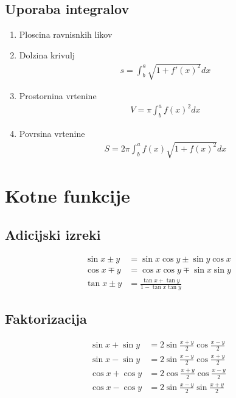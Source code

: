 \documentclass[a4paper,oneside,10pt]{article}
\theoremstyle{definition}
\begin{document}
\begin{multicols}{2}
	\subsection*{Uporaba integralov}
	\begin{enumerate}
		\item Ploscina ravnisnkih likov
		\item Dolzina krivulj
		\begin{align*}
			s = \int_{b}^{a} \sqrt{1 + f'(x)^2} dx
		\end{align*}
		\item Prostornina vrtenine
		\begin{align*}
			V = \pi \int_{b}^{a} f(x)^2 dx
		\end{align*}
		\item Povrsina vrtenine
		\begin{align*}
			S = 2\pi \int_{b}^{a} f(x)\sqrt{1+f(x)^2} dx
		\end{align*}
	\end{enumerate}
%
	\section*{Kotne funkcije}
	\subsection*{Adicijski izreki}
	\begin{align*}
		\sin{x \pm y} &= \sin{x}\cos{y} \pm \sin{y}\cos{x}\\
		\cos{x \mp y} &= \cos{x}\cos{y} \mp \sin{x}\sin{y}\\
		\tan{x \pm y} &= \frac{\tan{x} + \tan{y}}{1 - \tan{x}\tan{y}}
	\end{align*}
	\subsection*{Faktorizacija}
	\begin{align*}
		\sin{x} + \sin{y} &= 2\sin{\frac{x+y}{2}} \cos{\frac{x-y}{2}}\\
		\sin{x} - \sin{y} &= 2\sin{\frac{x-y}{2}} \cos{\frac{x+y}{2}}\\
		\cos{x} + \cos{y} &= 2\cos{\frac{x+y}{2}} \cos{\frac{x-y}{2}}\\
		\cos{x} - \cos{y} &= 2\sin{\frac{x-y}{2}} \sin{\frac{x+y}{2}}
	\end{align*}

\end{multicols}
\end{document}
